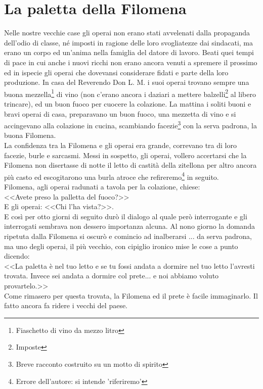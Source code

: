 
\chapter{La paletta della Filomena}
Nelle nostre vecchie case gli operai non erano stati avvelenati dalla propaganda dell'odio di classe, né imposti in ragione delle loro svogliatezze dai sindacati, ma erano un corpo ed un'anima nella famiglia del datore di lavoro. Beati quei tempi di pace in cui anche i nuovi ricchi non erano ancora venuti a spremere il prossimo ed in ispecie gli operai che dovevansi considerare fidati e parte della loro produzione. In casa del Reverendo Don L. M. i suoi operai trovano sempre una buona mezzella\footnote{Fiaschetto di vino da mezzo litro} di vino (non c'erano ancora i daziari a mettere balzelli\footnote{Imposte} al libero trincare), ed un buon fuoco per cuocere la colazione. La mattina i soliti buoni e bravi operai di casa, preparavano un buon fuoco, una mezzetta di vino e si accingevano alla colazione in cucina, scambiando facezie\footnote{Breve racconto costruito su un motto di spirito} con la serva padrona, la buona Filomena.\\
\indent La confidenza tra la Filomena e gli operai era grande, correvano tra di loro facezie, burle e sarcasmi. Messi in sospetto, gli operai, vollero accertarsi che la Filomena non disertasse di notte il letto di castità della zitellona per altro ancora più casto ed escogitarono una burla atroce che refireremo\footnote{Errore dell'autore: si intende 'riferiremo'} in seguito. \\
Filomena, agli operai radunati a tavola per la colazione, chiese:\\
\indent <<Avete preso la palletta del fuoco?>>\\
\indent E gli operai: <<Chi l'ha vista?>>.\\
\indent E così per otto giorni di seguito durò il dialogo al quale però interrogante e gli interrogati sembrava non dessero importanza alcuna. Al nono giorno la domanda ripetuta dalla Filomena si oscurò e comincio ad inalberarsi ... da serva padrona, ma uno degli operai, il più vecchio, con cipiglio ironico mise le cose a punto dicendo:\\
\indent <<La paletta è nel tuo letto e se tu fossi andata a dormire nel tuo letto l'avresti trovata. Invece sei andata a dormire col prete... e noi abbiamo voluto provartelo.>>\\
Come rimasero per questa trovata, la Filomena ed il prete è facile immaginarlo. Il fatto ancora fa ridere i vecchi del paese.

